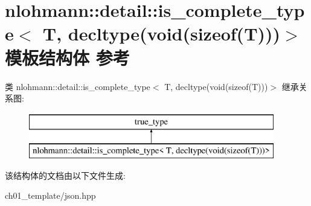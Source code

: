 \hypertarget{structnlohmann_1_1detail_1_1is__complete__type_3_01_t_00_01decltype_07void_07sizeof_07_t_08_08_08_4}{}\section{nlohmann\+::detail\+::is\+\_\+complete\+\_\+type$<$ T, decltype(void(sizeof(T)))$>$ 模板结构体 参考}
\label{structnlohmann_1_1detail_1_1is__complete__type_3_01_t_00_01decltype_07void_07sizeof_07_t_08_08_08_4}
类 nlohmann\+::detail\+::is\+\_\+complete\+\_\+type$<$ T, decltype(void(sizeof(T)))$>$ 继承关系图\+:\begin{figure}[H]
\begin{center}
\leavevmode
\includegraphics[height=2.000000cm]{structnlohmann_1_1detail_1_1is__complete__type_3_01_t_00_01decltype_07void_07sizeof_07_t_08_08_08_4}
\end{center}
\end{figure}


该结构体的文档由以下文件生成\+:\begin{DoxyCompactItemize}
\item 
ch01\+\_\+template/json.\+hpp\end{DoxyCompactItemize}

